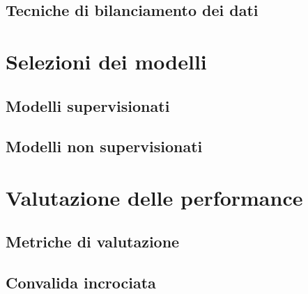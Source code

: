 \subsection{Tecniche di bilanciamento dei dati}




\section{Selezioni dei modelli}
\subsection{Modelli supervisionati}
\subsection{Modelli non supervisionati}
\section{Valutazione delle performance}
\subsection{Metriche di valutazione}
\subsection{Convalida incrociata}

